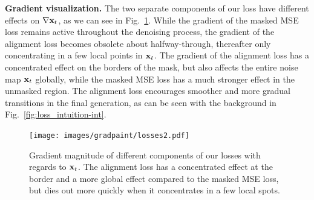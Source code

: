 \noindent \textbf{Gradient visualization.} The two separate components of our loss have different effects on $\nabla{\mathbf{x}_t}$, as we can see in Fig.~\ref{fig:loss_intuition-grad}.  While the gradient of the masked MSE loss remains active throughout the denoising process, the gradient of the alignment loss becomes obsolete about halfway-through, thereafter only concentrating in a few local points in $\mathbf{x}_t$. The gradient of the alignment loss has a concentrated effect on the borders of the mask, but also affects the entire noise map $\mathbf{x}_t$ globally, while the masked MSE loss has a much stronger effect in the unmasked region. The alignment loss encourages smoother and more gradual transitions in the final generation, as can be seen with the background in Fig.~\ref{fig:loss_intuition-int}. 





\begin{figure}[htbp]
  \centering
    \texttt{[image: images/gradpaint/losses2.pdf]}
    \caption{Gradient magnitude of different components of our losses with regards to $\mathbf{x}_t$. 
    The alignment loss has a concentrated effect at the border and a more global effect
     compared to the masked MSE loss, but dies out more quickly when it concentrates in a few local spots.}
\label{fig:loss_intuition-grad}
\end{figure}

